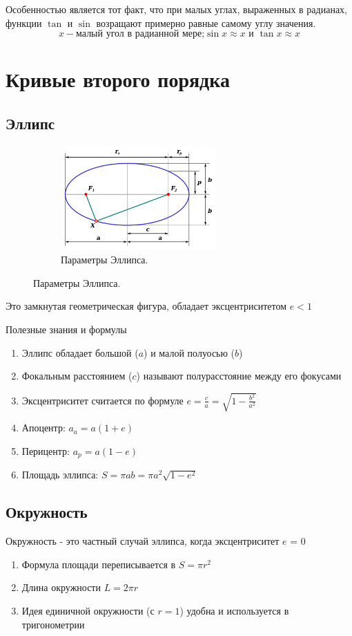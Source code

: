 \documentclass[16pt,a4paper]{report}
\begin{document}
Особенностью является тот факт, что при малых углах, выраженных в радианах, функции $\tan$ и $\sin$ возращают примерно равные самому углу значения.
$$x - \textrm{малый угол в радианной мере;} \sin{x} \approx x \textrm{ и } \tan{x} \approx x$$
\section{Кривые второго порядка}
\subsection{Эллипс}
\begin{figure}[H]
    \centering
    \begin{subfigure}{0.65\textwidth}
        \centering
        \includegraphics[width=0.65\textwidth]{400px-Ellipse_parameters_3.svg.png}
        \caption{Параметры Эллипса.}
        \label{fig:first}
    \end{subfigure}    
    \qquad
\end{figure}
Это замкнутая геометрическая фигура, обладает эксцентриситетом $e < 1$

Полезные знания и формулы
\begin{enumerate}
    \item Эллипс обладает большой ($a$) и малой полуосью ($b$)
    \item Фокальным расстоянием ($c$) называют полурасстояние между его фокусами
    \item Эксцентриситет считается по формуле $e = \frac{c}{a} = \sqrt{1-\frac{b^2}{a^2}}$
    \item Апоцентр: $a_a = a (1+e)$
    \item Перицентр: $a_p = a (1-e)$
    \item Площадь эллипса: $S = \pi ab = \pi a^2\sqrt{1-e^2}$
\end{enumerate}
\subsection{Окружность}
Окружность - это частный случай эллипса, когда эксцентриситет $e$ = 0
\begin{enumerate}
    \item Формула площади переписывается в $S = \pi r^2$
    \item Длина окружности $L = 2\pi r $
    \item Идея единичной окружности (с $r=1$) удобна и используется в тригонометрии
\end{enumerate}
\end{document}
